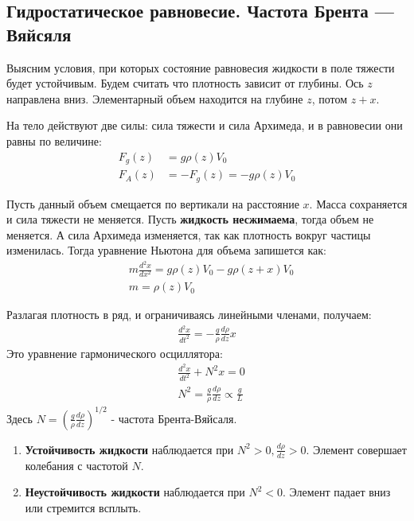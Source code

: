 \subsection{Гидростатическое равновесие. Частота Брента — Вяйсяля}
Выясним условия, при  которых состояние равновесия жидкости в поле тяжести будет устойчивым.
Будем считать что плотность зависит от глубины. Ось $z$ направлена вниз. Элементарный  объем   находится на глубине $z$, потом $z+x$.

На тело действуют две силы: сила тяжести и сила Архимеда, и в равновесии они равны  по величине:
\begin{align*}
F _ { g } ( z ) &= g \rho ( z ) V _ { 0 } \\
F _ { A } ( z ) &= - F _ { g } ( z ) = - g \rho ( z ) V _ { 0 }
\end{align*}

Пусть данный объем смещается по вертикали на расстояние $x$. Масса сохраняется и сила тяжести не меняется.  Пусть \textbf{жидкость несжимаема}, тогда объем не меняется. А сила Архимеда изменяется, так как плотность вокруг частицы изменилась. Тогда уравнение  Ньютона для объема запишется как:
\begin{align*}
& m \frac { d ^ { 2 } x } { d x ^ { 2 } } = g \rho ( z ) V _ { 0 } - g \rho ( z + x ) V _ { 0 } \\
& m = \rho ( z ) V _ { 0 }
\end{align*}

Разлагая плотность в ряд, и ограничиваясь линейными членами, получаем:
\begin{align*}
\frac { d ^ { 2 } x } { d t ^ { 2 } } = - \frac { g } { \rho } \frac { d \rho } { d z } x
\end{align*}
Это уравнение гармонического осциллятора:
\begin{align*}
& \frac { d ^ { 2 } x } { d t ^ { 2 } } + N ^ { 2 } x = 0 \\
& N ^ { 2 } = \frac { g } { \rho } \frac { d \rho } { d z } \propto \frac { g } { L }
\end{align*}
Здесь $ N = \left( \frac { g } { \rho } \frac { d \rho } { d z } \right) ^ { 1 / 2 } $ - частота Брента-Вяйсаля.
\begin{enumerate}
	\item {\textbf{Устойчивость жидкости} наблюдается при $ N ^ { 2 } > 0 , \frac { d \rho } { d z } > 0$. Элемент совершает колебания с частотой $N$.}
	\item {\textbf{Неустойчивость жидкости} наблюдается при $ N ^ { 2 } < 0 $. Элемент падает вниз или стремится всплыть.}
\end{enumerate}
